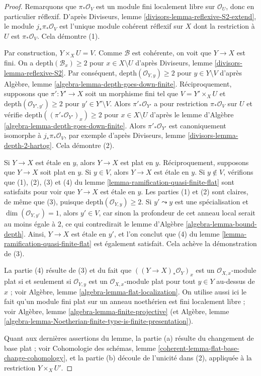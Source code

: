 \begin{proof}
Remarquons que $\pi_*\mathcal{O}_V$ est un module fini localement libre
sur $\mathcal{O}_U$, donc en particulier réflexif.
D'après Diviseurs, lemme \ref{divisors-lemma-reflexive-S2-extend},
le module $j_*\pi_*\mathcal{O}_V$ est l'unique
module cohérent réflexif sur $X$ dont la restriction à $U$
est $\pi_*\mathcal{O}_V$. Cela démontre (1).

\medskip\noindent
Par construction, $Y \times_X U = V$.
Comme $\mathcal{B}$ est cohérente, on voit que $Y \to X$ est fini.
On a $\text{depth}(\mathcal{B}_x) \geq 2$ pour $x \in X \setminus U$
d'après Diviseurs, lemme \ref{divisors-lemma-reflexive-S2}.
Par conséquent, $\text{depth}(\mathcal{O}_{Y, y}) \geq 2$ pour $y \in Y \setminus V$
d'après Algèbre, lemme \ref{algebra-lemma-depth-goes-down-finite}.
Réciproquement, supposons que $\pi' : Y' \to X$ soit un morphisme fini tel que
$V = Y' \times_X U$ et $\text{depth}(\mathcal{O}_{Y', y'}) \geq 2$
pour $y' \in Y' \setminus V$. Alors $\pi'_*\mathcal{O}_{Y'}$
a pour restriction $\pi_*\mathcal{O}_V$ sur $U$ et vérifie
$\text{depth}((\pi'_*\mathcal{O}_{Y'})_x) \geq 2$ pour
$x \in X \setminus U$ d'après le
lemme d'Algèbre \ref{algebra-lemma-depth-goes-down-finite}.
Alors $\pi'_*\mathcal{O}_{Y'}$ est canoniquement isomorphe
à $j_*\pi_*\mathcal{O}_V$, par exemple d'après
Diviseurs, lemme \ref{divisors-lemma-depth-2-hartog}.
Cela démontre (2).

\medskip\noindent
Si $Y \to X$ est étale en $y$, alors $Y \to X$ est plat en $y$.
Réciproquement, supposons que $Y \to X$ soit plat en $y$.
Si $y \in V$, alors $Y \to X$ est étale en $y$.
Si $y \not \in V$, vérifions que (1), (2), (3) et (4) du
lemme \ref{lemma-ramification-quasi-finite-flat} sont satisfaits
pour voir que $Y \to X$ est étale en $y$. Les parties (1) et (2)
sont claires, de même que (3), puisque $\text{depth}(\mathcal{O}_{Y, y}) \geq 2$.
Si $y' \leadsto y$ est une spécialisation et $\dim(\mathcal{O}_{Y, y'}) = 1$,
alors $y' \in V$, car sinon la profondeur de cet anneau local
serait au moins égale à $2$, ce qui contredirait le
lemme d'Algèbre \ref{algebra-lemma-bound-depth}.
Ainsi, $Y \to X$ est étale en $y'$, et l'on conclut que (4) du
lemme \ref{lemma-ramification-quasi-finite-flat} est également satisfait.
Cela achève la démonstration de (3).

\medskip\noindent
La partie (4) résulte de (3) et du fait que $((Y \to X)_*\mathcal{O}_Y)_x$
est un $\mathcal{O}_{X, x}$-module plat si et seulement si $\mathcal{O}_{Y, y}$
est un $\mathcal{O}_{X, x}$-module plat pour tout $y \in Y$ au-dessus de $x$ ; voir
Algèbre, lemme \ref{algebra-lemma-flat-localization}. On utilise aussi ici
le fait qu'un module fini plat sur un anneau noethérien est fini localement
libre ; voir Algèbre, lemme \ref{algebra-lemma-finite-projective}
(et
Algèbre, lemme
\ref{algebra-lemma-Noetherian-finite-type-is-finite-presentation}).

\medskip\noindent
Quant aux dernières assertions du lemme, la partie (a) résulte du
changement de base plat ; voir
Cohomologie des schémas, lemme \ref{coherent-lemma-flat-base-change-cohomology},
et la partie (b) découle de l'unicité dans (2), appliquée à la restriction
$Y \times_X U'$.
\end{proof}

